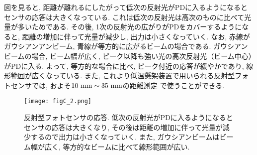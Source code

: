 \quad 図を見ると, 距離が離れるにしたがって低次の反射光がPDに入るようになるとセンサの応答は大きくなっている. これは低次の反射光は高次のものに比べて光量が多いためである. その後, 1次の反射光の広がりがPDをカバーするようになると, 距離の増加に伴って光量が減少し, 出力は小さくなっていく. 
\quad なお, 赤線がガウシアンアンビーム, 青線が等方的に広がるビームの場合である. ガウシアンビームの場合, ビーム幅が広く, ピーク以降も強い光の高次反射光（ビーム中心）がPDに入る. よって, 等方的な場合に比べ, ピーク付近の応答が緩やかであり, 線形範囲が広くなっている. また, これより低温懸架装置で用いられる反射型フォトセンサでは, およそ$10\,\,{\rm mm}\sim35\,\,{\rm mm}$の距離測定
で使うことができる.
\begin{figure}[H]
\begin{center}
\texttt{[image: figC\_2.png]}
\caption[反射型フォトセンサの応答]{反射型フォトセンサの応答. 低次の反射光がPDに入るようになるとセンサの応答は大きくなり, その後は距離の増加に伴って光量が減少するので出力は小さくなっていく. また, ガウシアンビームはビーム幅が広く, 等方的なビームに比べて線形範囲が広い. }
\label{figC.2}
\end{center}
\end{figure}